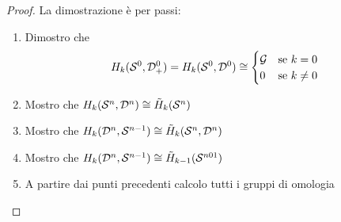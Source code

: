\begin{proof}
  La dimostrazione è per passi:
  \begin{enumerate}
  \item Dimostro che
    \[
      H_k(\mathcal{S}^{0}, \mathcal{D}^{0}_+) = H_k(\mathcal{S}^{0}, \mathcal{D}^{0}) \cong
      \begin{cases}
        \mathcal{G} & \text{se $ k = 0 $} \\
        0 & \text{se $ k \not = 0 $}
      \end{cases}
    \]
  \item Mostro che $ H_k(\mathcal{S}^{n}, \mathcal{D}^{n}) \cong \tilde{H}_k(\mathcal{S}^{n}) $
  \item Mostro che $ H_k(\mathcal{D}^{n}, \mathcal{S}^{n-1}) \cong \tilde{H}_k(\mathcal{S}^{n}, \mathcal{D}^{n}) $
  \item Mostro che $ H_k(\mathcal{D}^{n}, \mathcal{S}^{n-1}) \cong \tilde{H}_{k-1}(\mathcal{S}^{n01}) $
  \item A partire dai punti precedenti calcolo tutti i gruppi di omologia
  \end{enumerate}


\end{proof}
